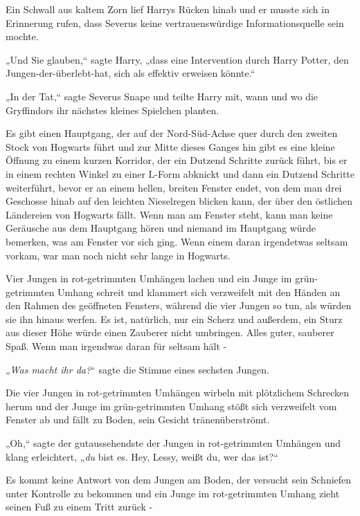 {Ein Schwall aus kaltem Zorn lief Harrys Rücken hinab und er musste sich in Erinnerung rufen, dass Severus keine vertrauenswürdige Informationsquelle sein mochte.

„Und Sie glauben,“ sagte Harry, „dass eine Intervention durch Harry Potter, den Jungen-der-überlebt-hat, sich als effektiv erweisen könnte.“

„In der Tat,“ sagte Severus Snape und teilte Harry mit, wann und wo die Gryffindors ihr nächstes kleines Spielchen planten.

\later

Es gibt einen Hauptgang, der auf der Nord-Süd-Achse quer durch den zweiten Stock von Hogwarts führt und zur Mitte dieses Ganges hin gibt es eine kleine Öffnung zu einem kurzen Korridor, der ein Dutzend Schritte zurück führt, bis er in einem rechten Winkel zu einer L-Form abknickt und dann ein Dutzend Schritte weiterführt, bevor er an einem hellen, breiten Fenster endet, von dem man drei Geschosse hinab auf den leichten Nieselregen blicken kann, der über den östlichen Ländereien von Hogwarts fällt. Wenn man am Fenster steht, kann man keine Geräusche aus dem Hauptgang hören und niemand im Hauptgang würde bemerken, was am Fenster vor sich ging. Wenn einem daran irgendetwas seltsam vorkam, war man noch nicht sehr lange in Hogwarts.

Vier Jungen in rot-getrimmten Umhängen lachen und ein Junge im grün-getrimmten Umhang schreit und klammert sich verzweifelt mit den Händen an den Rahmen des geöffneten Fensters, während die vier Jungen so tun, als würden sie ihn hinaus werfen. Es ist, natürlich, nur ein Scherz und außerdem, ein Sturz aus dieser Höhe würde einen Zauberer nicht umbringen. Alles guter, sauberer Spaß. Wenn man irgendwas daran für seltsam hält -

„\emph{Was macht ihr da?}“ sagte die Stimme eines sechsten Jungen.

Die vier Jungen in rot-getrimmten Umhängen wirbeln mit plötzlichem Schrecken herum und der Junge im grün-getrimmten Umhang stößt sich verzweifelt vom Fenster ab und fällt zu Boden, sein Gesicht tränenüberströmt.

„Oh,“ sagte der gutaussehendste der Jungen in rot-getrimmten Umhängen und klang erleichtert, „\emph{du} bist es. Hey, Lessy, weißt du, wer das ist?“

Es kommt keine Antwort von dem Jungen am Boden, der versucht sein Schniefen unter Kontrolle zu bekommen und ein Junge im rot-getrimmten Umhang zieht seinen Fuß zu einem Tritt zurück -

}
